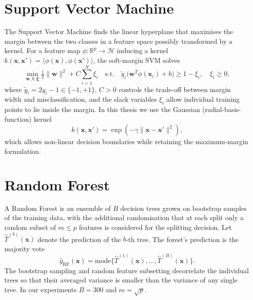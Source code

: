 \section{Support Vector Machine}
\label{sec:svm}

The Support Vector Machine finds the linear
hyperplane that maximises the margin between the two classes in a
feature space possibly transformed by a kernel. For a feature map
$\phi:\mathbb{R}^{p}\to\mathcal{H}$ inducing a kernel
$k(\mathbf{x},\mathbf{x}')=\langle\phi(\mathbf{x}),\phi(\mathbf{x}')\rangle$,
the soft-margin SVM solves
\begin{equation}
\min_{\mathbf{w},b,\boldsymbol{\xi}}
\tfrac{1}{2}\lVert\mathbf{w}\rVert^{2}
+ C\sum_{i=1}^{N}\xi_i
\quad\text{s.t.}\quad
\tilde y_i\bigl(\mathbf{w}^{T}\phi(\mathbf{x}_i)+b\bigr)\geq 1-\xi_i,
\quad \xi_i\geq 0,
\tag{2.6}
\label{eq:svm}
\end{equation}
where $\tilde y_i=2y_i-1\in\{-1,+1\}$, $C>0$ controls the trade-off
between margin width and misclassification, and the slack variables
$\xi_i$ allow individual training points to lie inside the margin.
In this thesis we use the Gaussian (radial-basis-function) kernel
\begin{equation}
k(\mathbf{x},\mathbf{x}')
=\exp\!\left(-\gamma\lVert\mathbf{x}-\mathbf{x}'\rVert^{2}\right),
\tag{2.7}
\end{equation}
which allows non-linear decision boundaries while retaining the
maximum-margin formulation.

\section{Random Forest}
\label{sec:rf}

A Random Forest \citep{breiman2001random} is an ensemble of $B$
decision trees grown on bootstrap samples of the training data, with
the additional randomisation that at each split only a random subset
of $m\leq p$ features is considered for the splitting decision. Let
$\hat T^{(b)}(\mathbf{x})$ denote the prediction of the $b$-th tree.
The forest's prediction is the majority vote
\begin{equation}
\hat y_{\mathrm{RF}}(\mathbf{x})
=
\mathrm{mode}
\bigl\{\hat T^{(1)}(\mathbf{x}),\ldots,\hat T^{(B)}(\mathbf{x})\bigr\}.
\tag{2.8}
\label{eq:rf}
\end{equation}
The bootstrap sampling and random feature subsetting decorrelate the
individual trees so that their averaged variance is smaller than the
variance of any single tree. In our experiments $B=300$ and
$m=\sqrt{p}$.

